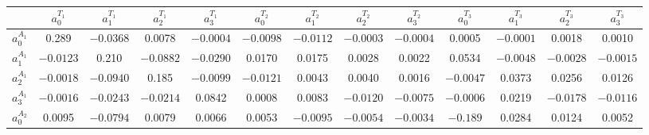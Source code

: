 \documentclass[aps,superscriptaddress,showpacs,nofootinbib,11pt]{revtex4-1}
\newcommand\tstrut{\rule{0pt}{2.9ex}}       %
\begin{document}
%
\begin{table}[h]
\begin{ruledtabular}
\begin{center}
\footnotesize{\begin{tabular}{ccccccccccccc}
 & $a_0^{{T_1}}$&$a_1^{{T_1}}$&$a_2^{{T_1}}$&$a_3^{{T_1}}$
& $a_0^{{T_2}}$&$a_1^{{T_2}}$&$a_2^{{T_2}}$&$a_3^{{T_2}}$& $a_0^{{T_3}}$&$a_1^{{T_3}}$&$a_2^{{T_3}}$&$a_3^{{T_3}}$\\ \hline \tstrut
$a_0^{{A_1}}$&  \hspace{.05cm}0.289 &$-0.0368$& \hspace{.25cm}0.0078 & $-0.0004$ &$-0.0098$ & $-0.0112$ & $-0.0003$ & $-0.0004$ &  \hspace{.25cm}0.0005 & $-0.0001$ & 
  \hspace{.25cm}0.0018 &  \hspace{.25cm}0.0010\\
$a_1^{{A_1}}$& $-0.0123$  & \hspace{.05cm}0.210&  $-0.0882$&  $-0.0290$ &  \hspace{.25cm}0.0170 &  \hspace{.25cm}0.0175  & \hspace{.25cm}0.0028 &  \hspace{.25cm}0.0022  & \hspace{.25cm}0.0534 & $-0.0048$ &
 $-0.0028$ & $-0.0015$\\
$a_2^{{A_1}}$& $-0.0018$ & $-0.0940$ &  \hspace{.05cm}0.185&  $-0.0099$ & $-0.0121$ &  \hspace{.25cm}0.0043&   \hspace{.25cm}0.0040 &  \hspace{.25cm}0.0016 & $-0.0047$ &  \hspace{.25cm}0.0373 & 
 \hspace{.25cm}0.0256 &  \hspace{.25cm}0.0126\\
$a_3^{{A_1}}$& $-0.0016$ & $-0.0243$ & $-0.0214$ &  \hspace{.25cm}0.0842 &  \hspace{.25cm}0.0008 &  \hspace{.25cm}0.0083 & $-0.0120$ & $-0.0075$ & $-0.0006$ &  \hspace{.25cm}0.0219&  $-0.0178$&  $-0.0116$\\
$a_0^{{A_2}}$&  \hspace{.25cm}0.0095 & $-0.0794$&   \hspace{.25cm}0.0079 &  \hspace{.25cm}0.0066 &  \hspace{.25cm}0.0053 & $-0.0095$ & $-0.0054$ & $-0.0034$ & $-0.189$ &  \hspace{.25cm}0.0284 &  \hspace{.25cm}0.0124&   \hspace{.25cm}0.0052\\

\end{tabular}}
\end{center}
\end{ruledtabular}
\end{table}
\end{document}
